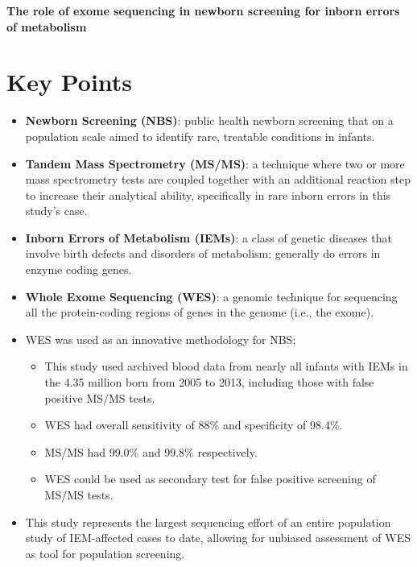 \documentclass[plain,basic]{inVerba-notes}
\begin{document}
    

\begin{center}
    \textbf{\Large{The role of exome sequencing in newborn screening for inborn errors of metabolism}}
\end{center}

\section{Key Points}
\begin{itemize}
    \item \textbf{Newborn Screening (NBS)}: public health newborn screening that on a population scale aimed to identify rare, treatable conditions in infants.
    \item \textbf{Tandem Mass Spectrometry (MS/MS)}: a technique where two or more mass spectrometry tests are coupled together with an additional reaction step to increase their analytical ability, specifically in rare inborn errors in this study's case.
    \item \textbf{Inborn Errors of Metabolism (IEMs)}: a class of genetic diseases that involve birth defects and disorders of metabolism; generally do errors in enzyme coding genes.
    \item \textbf{Whole Exome Sequencing (WES)}: a genomic technique for sequencing all the protein-coding regions of genes in the genome (i.e., the exome). 
    \item WES was used as an innovative methodology for NBS\@;
        \begin{itemize}
            \item This study used archived blood data from nearly all  infants with IEMs in the 4.35 million born from 2005 to 2013, including those with false positive MS/MS tests.
            \item WES had overall sensitivity of 88\% and specificity of 98.4\%.        
            \item MS/MS had 99.0\% and 99.8\% respectively.
            \item WES could be used as secondary test for false positive screening of MS/MS tests.
        \end{itemize}
    \item This study represents the largest sequencing effort of an entire population study of IEM-affected cases to date, allowing for unbiased assessment of WES as tool for population screening.
\end{itemize}
\end{document}
